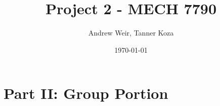 \documentclass[12pt, letterpaper, onecolumn]{article}
\title{Project 2 - MECH 7790}
\author{Andrew Weir, Tanner Koza}
\date\today
\begin{document}
\maketitle

\section*{Part II: Group Portion}


\clearpage

\clearpage

\clearpage

\end{document}

